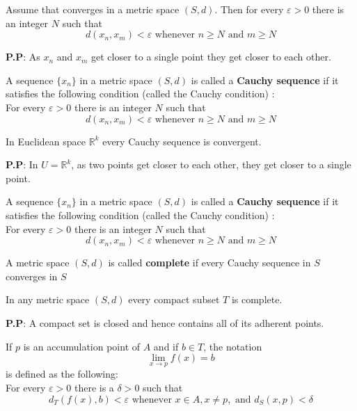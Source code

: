 \documentclass[10pt,a4paper]{book}
\begin{document}
\begin{Thm}
Assume that converges in a metric space $(S, d)$. Then for every $\varepsilon > 0$ there is an integer $N$ such that
$$d(x_n, x_m) < \varepsilon \text{ whenever } n \geq N \text{ and } m\geq N$$
\end{Thm}
\noindent \textbf{P.P}: As $x_n$ and $x_m$ get closer to a single point they get closer to each other. 

\begin{deff}
    A sequence $\{x_n\}$ in a metric space $(S, d)$ is called a \textbf{Cauchy sequence} if it satisfies the following condition (called the Cauchy condition) :\\
    \hspace*{1cm} For every $\varepsilon >0$ there is an integer $N$ such that
    $$d(x_n, x_m) < \varepsilon \text{ whenever } n \geq N \text{ and } m\geq N$$

\end{deff}

\begin{Thm}
In Euclidean space $\mathbb{R}^k$ every Cauchy sequence is convergent.
\end{Thm}
\noindent \textbf{P.P}: In $ U = \mathbb{R}^k$, as two points get closer to each other, they get closer to a single point.

\begin{deff}
    A sequence $\{x_n\}$ in a metric space $(S, d)$ is called a \textbf{Cauchy sequence} if it satisfies the following condition (called the Cauchy condition) :\\
    \hspace*{1cm} For every $\varepsilon >0$ there is an integer $N$ such that
    $$d(x_n, x_m) < \varepsilon \text{ whenever } n \geq N \text{ and } m\geq N$$

\end{deff} A metric space $(S, d)$ is called \textbf{complete} if every Cauchy sequence in $S$ converges in $S$

\begin{Thm}
In any metric space $(S, d)$ every compact subset $T$ is complete.
\end{Thm}
\noindent \textbf{P.P}: A compact set is closed and hence contains all of its adherent points.

\begin{deff}
    If $p$ is an accumulation point of $A$ and if $b \in T$, the notation \\
        $$\lim_{x \rightarrow p} f(x) =  b$$
        is defined as the following:\\
    \hspace*{1cm} For every $\varepsilon >0$ there is a $\delta > 0$ such that
    $$d_T(f(x), b) < \varepsilon \text{ whenever }x \in A, x \neq p, \text{ and } d_S(x,p) < \delta$$

\end{deff} 
\end{document}
